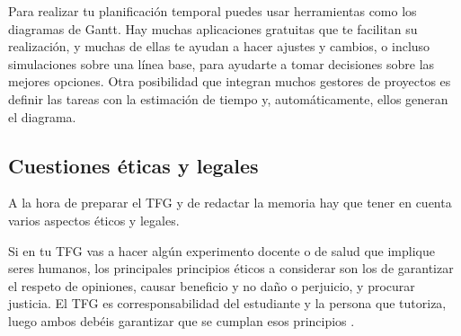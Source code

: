 Para realizar tu planificación temporal puedes usar herramientas como los diagramas de Gantt. Hay muchas aplicaciones gratuitas que te facilitan su realización, y muchas de ellas te ayudan a hacer ajustes y cambios, o incluso simulaciones sobre una línea base, para ayudarte a tomar decisiones sobre las mejores opciones. Otra posibilidad que integran muchos gestores de proyectos es definir las tareas con la estimación de tiempo y, automáticamente, ellos generan el diagrama.


\subsection{Cuestiones éticas y legales}%

A la hora de preparar el TFG y de redactar la memoria hay que tener en cuenta varios aspectos éticos y legales.

Si en tu TFG vas a hacer algún experimento docente o de salud que implique seres humanos, los principales principios éticos a considerar son los de garantizar el respeto de opiniones, causar beneficio y no daño o perjuicio, y procurar justicia. El TFG es corresponsabilidad del estudiante y la persona que tutoriza, luego ambos debéis garantizar que se cumplan esos principios \cite{EticaCantabria}. 

